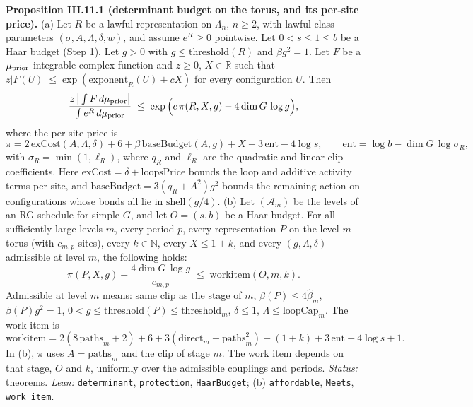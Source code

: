 \documentclass[
  letterpaper,
  11pt]{article}
\begin{document}
\textbf{Proposition III.11.1 (determinant budget on the torus, and its
per-site price).} (a) Let \(R\) be a lawful representation on
\(\Lambda_n\), \(n\ge2\), with lawful-class parameters
\((\sigma,A,\Lambda,\delta,w)\), and assume \(e^{R}\ge0\) pointwise. Let
\(0<s\le1\le b\) be a Haar budget (Step 1). Let \(g>0\) with
\(g\le\mathrm{threshold}(R)\) and \(\beta g^2=1\). Let \(F\) be a
\(\mu_{\rm prior}\)-integrable complex function and \(z\ge0\),
\(X\in\mathbb R\) such that
\(z|F(U)|\le\exp(\mathrm{exponent}_R(U)+cX)\) for every configuration
\(U\). Then
\[\frac{z\,\big|\int F\,d\mu_{\rm prior}\big|}{\int e^{R}\,d\mu_{\rm prior}}\;\le\;\exp\Big(c\,\pi(R,X,g)-4\dim G\,\log g\Big),\]
where the per-site price is
\[\pi=2\,\mathrm{exCost}(A,\Lambda,\delta)+6+\beta\,\mathrm{baseBudget}(A,g)+X+3\,\mathrm{ent}-4\log s,\qquad \mathrm{ent}=\log b-\dim G\,\log\sigma_R,\]
with \(\sigma_R=\min(1,\ell_R)\), where \(q_R\) and \(\ell_R\) are the
quadratic and linear clip coefficients. Here
\(\mathrm{exCost}=\delta+\mathrm{loopsPrice}\) bounds the loop and
additive activity terms per site, and
\(\mathrm{baseBudget}=3(q_R+A^2)g^2\) bounds the remaining action on
configurations whose bonds all lie in \(\mathrm{shell}(g/4)\). (b) Let
\((\mathcal A_m)\) be the levels of an RG schedule for simple \(G\), and
let \(O=(s,b)\) be a Haar budget. For all sufficiently large levels
\(m\), every period \(p\), every representation \(P\) on the level-\(m\)
torus (with \(c_{m,p}\) sites), every \(k\in\mathbb N\), every
\(X\le1+k\), and every \((g,\Lambda,\delta)\) admissible at level \(m\),
the following holds:
\[\pi(P,X,g)-\frac{4\dim G\,\log g}{c_{m,p}}\;\le\;\mathrm{work item}(O,m,k).\]
Admissible at level \(m\) means: same clip as the stage of \(m\),
\(\beta(P)\le4\hat\beta_m\), \(\beta(P)g^2=1\),
\(0<g\le\mathrm{threshold}(P)\le\mathrm{threshold}_m\), \(\delta\le1\),
\(\Lambda\le\mathrm{loopCap}_m\). The work item is
\[\mathrm{work item}=2(8\,\mathrm{paths}_m+2)+6+3(\mathrm{direct}_m+\mathrm{paths}_m^2)+(1+k)+3\,\mathrm{ent}-4\log s+1.\]
In (b), \(\pi\) uses \(A=\mathrm{paths}_m\) and the clip of stage \(m\).
The work item depends on that stage, \(O\) and \(k\), uniformly over the
admissible couplings and periods. \emph{Status:} theorems. \emph{Lean:}
\href{https://github.com/yang-mills-group/OpenAI-YM-20261028/blob/3456e5e75cf8d4cd558955a5c7638fba2d68f464/YM/Next/RANK/Determinant.lean\#L240-L274}{\texttt{determinant}},
\href{https://github.com/yang-mills-group/OpenAI-YM-20261028/blob/3456e5e75cf8d4cd558955a5c7638fba2d68f464/YM/Next/RANK/Determinant.lean\#L225-L227}{\texttt{protection}},
\href{https://github.com/yang-mills-group/OpenAI-YM-20261028/blob/3456e5e75cf8d4cd558955a5c7638fba2d68f464/YM/Next/RANK/Determinant.lean\#L26-L33}{\texttt{HaarBudget}};
(b)
\href{https://github.com/yang-mills-group/OpenAI-YM-20261028/blob/3456e5e75cf8d4cd558955a5c7638fba2d68f464/YM/Next/RANK/StationMeter.lean\#L119-L123}{\texttt{affordable}},
\href{https://github.com/yang-mills-group/OpenAI-YM-20261028/blob/3456e5e75cf8d4cd558955a5c7638fba2d68f464/YM/Next/RANK/StationMeter.lean\#L28-L36}{\texttt{Meets}},
\href{https://github.com/yang-mills-group/OpenAI-YM-20261028/blob/3456e5e75cf8d4cd558955a5c7638fba2d68f464/YM/Next/RANK/StationMeter.lean\#L41-L44}{\texttt{work\ item}}.
\end{document}
